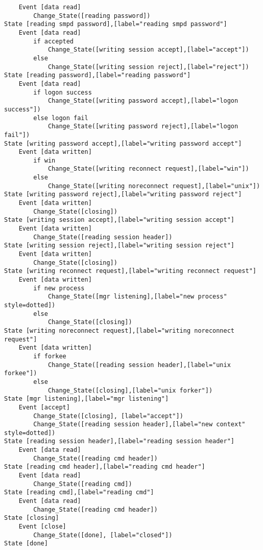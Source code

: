 \begin{verbatim}
	Event [data read]
		Change_State([reading password])
State [reading smpd password],[label="reading smpd password"]
	Event [data read]
		if accepted
			Change_State([writing session accept],[label="accept"])
		else
			Change_State([writing session reject],[label="reject"])
State [reading password],[label="reading password"]
	Event [data read]
		if logon success
			Change_State([writing password accept],[label="logon success"])
		else logon fail
			Change_State([writing password reject],[label="logon fail"])
State [writing password accept],[label="writing password accept"]
	Event [data written]
		if win
			Change_State([writing reconnect request],[label="win"])
		else
			Change_State([writing noreconnect request],[label="unix"])
State [writing password reject],[label="writing password reject"]
	Event [data written]
		Change_State([closing])
State [writing session accept],[label="writing session accept"]
	Event [data written]
		Change_State([reading session header])
State [writing session reject],[label="writing session reject"]
	Event [data written]
		Change_State([closing])
State [writing reconnect request],[label="writing reconnect request"]
	Event [data written]
		if new process
			Change_State([mgr listening],[label="new process" style=dotted])
		else
			Change_State([closing])
State [writing noreconnect request],[label="writing noreconnect request"]
	Event [data written]
		if forkee
			Change_State([reading session header],[label="unix forkee"])
		else
			Change_State([closing],[label="unix forker"])
State [mgr listening],[label="mgr listening"]
	Event [accept]
		Change_State([closing], [label="accept"])
		Change_State([reading session header],[label="new context" style=dotted])
State [reading session header],[label="reading session header"]
	Event [data read]
		Change_State([reading cmd header])
State [reading cmd header],[label="reading cmd header"]
	Event [data read]
		Change_State([reading cmd])
State [reading cmd],[label="reading cmd"]
	Event [data read]
		Change_State([reading cmd header])
State [closing]
	Event [close]
		Change_State([done], [label="closed"])
State [done]
\end{verbatim}
